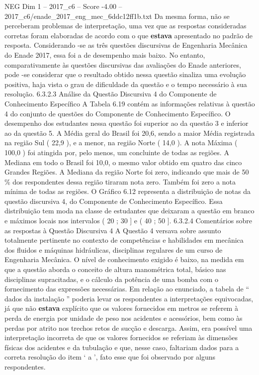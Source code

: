 \begin{textsample}{NEG Dim 1 – 2017\_c6 – Score -4.00 – 2017\_c6/enade\_2017\_eng\_mec\_6ddc12ff1b.txt}
Da mesma forma, não se perceberam problemas de interpretação, uma vez que as respostas consideradas corretas foram elaboradas de acordo com o que \textbf{estava} apresentado no padrão de resposta.
Considerando -se as três questões discursivas de Engenharia Mecânica do Enade 2017, essa foi a de desempenho mais baixo.
No entanto, comparativamente às questões discursivas das avaliações do Enade anteriores, pode -se considerar que o resultado obtido nessa questão sinaliza uma evolução positiva, haja vista o grau de dificuldade da questão e o tempo necessário à sua resolução. 6.3.2.3 Análise da Questão Discursiva 4 do Componente de Conhecimento Específico A Tabela 6.19 contém as informações relativas à questão 4 do conjunto de questões do Componente de Conhecimento Específico.
O desempenho dos estudantes nessa questão foi superior ao da questão 3 e inferior ao da questão 5.
A Média geral do Brasil foi 20,6, sendo a maior Média registrada na região Sul ( 22,9 ), e a menor, na região Norte ( 14,0 ).
A nota Máxima ( 100,0 ) foi atingida por, pelo menos, um concluinte de todas as regiões.
A Mediana em todo o Brasil foi 10,0, o mesmo valor obtido em quatro das cinco Grandes Regiões.
A Mediana da região Norte foi zero, indicando que mais de 50 \% dos respondentes dessa região tiraram nota zero.
Também foi zero a nota mínima de todas as regiões.
O Gráfico 6.12 representa a distribuição de notas da questão discursiva 4, do Componente de Conhecimento Específico.
Essa distribuição tem moda na classe de estudantes que deixaram a questão em branco e máximos locais nos intervalos ( 20 ; 30 ] e ( 40 ; 50 ]. 6.3.2.4 Comentários sobre as respostas à Questão Discursiva 4 A Questão 4 versava sobre assunto totalmente pertinente no contexto de competências e habilidades em mecânica dos fluidos e máquinas hidráulicas, disciplinas regulares de um curso de Engenharia Mecânica.
O nível de conhecimento exigido é baixo, na medida em que a questão aborda o conceito de altura manométrica total, básico nas disciplinas supracitadas, e o cálculo da potência de uma bomba com o fornecimento das expressões necessárias.
Em relação ao enunciado, a tabela de “ dados da instalação ” poderia levar os respondentes a interpretações equivocadas, já que não \textbf{estava} explícito que os valores fornecidos em metros se referem à perda de energia por unidade de peso nos acidentes e acessórios, bem como às perdas por atrito nos trechos retos de sucção e descarga.
Assim, era possível uma interpretação incorreta de que os valores fornecidos se referiam às dimensões físicas dos acidentes e da tubulação e que, nesse caso, faltariam dados para a correta resolução do item ‘ a ’, fato esse que foi observado por alguns respondentes.

\end{textsample}
